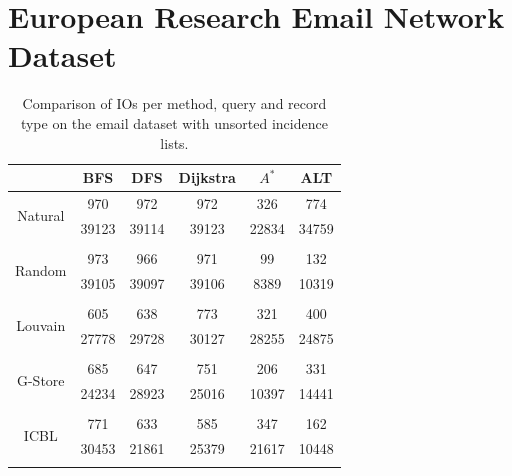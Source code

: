 \section*{European Research Email Network Dataset}
\begin{table}[H]
	\begin{center}
		 \begin{tabular}[c]{c c c c c c} \toprule
			  & BFS & DFS & Dijkstra & $A^*$  & ALT \\ \midrule 
 			\multirow{2}{*}{Natural}  & 970 & 972 & 972 & 326 & 774 \\ 
 				 & 39123 & 39114 & 39123 & 22834 & 34759 \\ 
 				&&&&& \\[-0.5em]
 			\multirow{2}{*}{Random}  & 973 & 966 & 971 & 99 & 132 \\ 
 				 & 39105 & 39097 & 39106 & 8389 & 10319 \\ 
 				&&&&& \\[-0.5em]
 			\multirow{2}{*}{Louvain}  & 605 & 638 & 773 & 321 & 400 \\ 
 				 & 27778 & 29728 & 30127 & 28255 & 24875 \\ 
 				&&&&& \\[-0.5em]
 			\multirow{2}{*}{G-Store}  & 685 & 647 & 751 & 206 & 331 \\ 
 				 & 24234 & 28923 & 25016 & 10397 & 14441 \\ 
 				&&&&& \\[-0.5em]
 			\multirow{2}{*}{ICBL}  & 771 & 633 & 585 & 347 & 162 \\ 
 				 & 30453 & 21861 & 25379 & 21617 & 10448 \\ 
 				&&&&& \\[-0.5em]
 					\end{tabular}  
  	 \end{center}
	 \caption{Comparison of IOs per method, query and record type on the email dataset with unsorted incidence lists.}
	 \label{email-uns}
\end{table}

